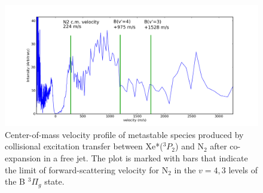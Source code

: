 \documentclass[12pt]{mitthesis}
\begin{document}
\begin{figure}
  \caption{Center-of-mass velocity profile of metastable species
    produced by collisional excitation transfer between Xe*($^3P_2$)
    and N$_2$ after co-expansion in a free jet.  The plot is marked
    with bars that indicate the limit of forward-scattering velocity
    for N$_2$ in the $v=4,3$ levels of the B $^3\Pi_g$ state.}
  \label{fig:old-cm}
  \centering
  \includegraphics[width=6.5in]{old-cm.png}
\end{figure}
\end{document}
